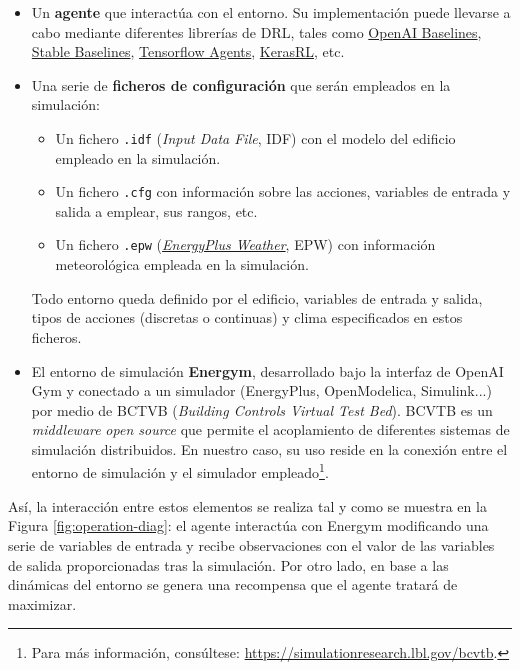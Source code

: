 \begin{itemize}
    \item Un \textbf{agente} que interactúa con el entorno. Su implementación puede llevarse a cabo mediante diferentes librerías de DRL, tales como \href{https://github.com/openai/baselines}{OpenAI Baselines}, \href{https://github.com/DLR-RM/stable-baselines3}{Stable Baselines}, \href{https://www.tensorflow.org/agents}{Tensorflow Agents},  \href{https://github.com/keras-rl/keras-rl}{KerasRL}, etc.
    \item Una serie de \textbf{ficheros de configuración} que serán empleados en la simulación:
        \begin{itemize}
            \item Un fichero \texttt{.idf} (\textit{Input Data File}, IDF) con el modelo del edificio empleado en la simulación.
            \item Un fichero \texttt{.cfg} con información sobre las acciones, variables de entrada y salida a emplear, sus rangos, etc.
            \item Un fichero \texttt{.epw} (\href{https://energyplus.net/weather}{\textit{EnergyPlus Weather}}, EPW) con información meteorológica empleada en la simulación.
        \end{itemize}
    Todo entorno queda definido por el edificio, variables de entrada y salida, tipos de acciones (discretas o continuas) y clima especificados en estos ficheros.
    \item El entorno de simulación \textbf{Energym}, desarrollado bajo la interfaz de OpenAI Gym y conectado a un simulador (EnergyPlus, OpenModelica, Simulink...) por medio de BCTVB (\textit{Building Controls Virtual Test Bed}). BCVTB es un \textit{middleware} \textit{open source} que permite el acoplamiento de diferentes sistemas de simulación distribuidos. En nuestro caso, su uso reside en la conexión entre el entorno de simulación y el simulador empleado\footnote{Para más información, consúltese: \url{https://simulationresearch.lbl.gov/bcvtb}.}.
\end{itemize}

Así, la interacción entre estos elementos se realiza tal y como se muestra en la Figura \ref{fig:operation-diag}: el agente interactúa con Energym modificando una serie de variables de entrada y recibe observaciones con el valor de las variables de salida proporcionadas tras la simulación. Por otro lado, en base a las dinámicas del entorno se genera una recompensa que el agente tratará de maximizar.

